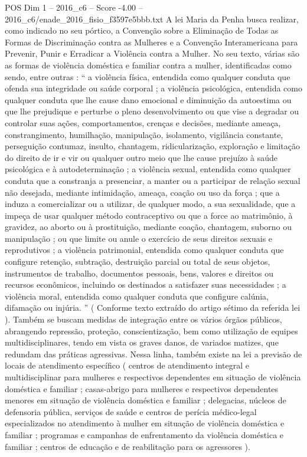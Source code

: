 \begin{textsample}{POS Dim 1 – 2016\_c6 – Score -4.00 – 2016\_c6/enade\_2016\_fisio\_f3597e5bbb.txt}
A lei Maria da Penha busca realizar, como indicado no seu pórtico, a Convenção sobre a Eliminação de Todas as Formas de Discriminação contra as Mulheres e a Convenção Interamericana para Prevenir, Punir e Erradicar a Violência contra a Mulher.
No seu texto, várias são as formas de violência doméstica e familiar contra a mulher, identificadas como sendo, entre outras : “ a violência física, entendida como qualquer conduta que ofenda sua integridade ou saúde corporal ; a violência psicológica, entendida como qualquer conduta que lhe cause dano emocional e diminuição da autoestima ou que lhe prejudique e perturbe o pleno desenvolvimento ou que vise a degradar ou controlar suas ações, comportamentos, crenças e decisões, mediante ameaça, constrangimento, humilhação, manipulação, isolamento, vigilância constante, perseguição contumaz, insulto, chantagem, ridicularização, exploração e limitação do direito de ir e vir ou qualquer outro meio que lhe cause prejuízo à saúde psicológica e à autodeterminação ; a violência sexual, entendida como qualquer conduta que a constranja a presenciar, a manter ou a participar de relação sexual não desejada, mediante intimidação, ameaça, coação ou uso da força ; que a induza a comercializar ou a utilizar, de qualquer modo, a sua sexualidade, que a impeça de usar qualquer método contraceptivo ou que a force ao matrimônio, à gravidez, ao aborto ou à prostituição, mediante coação, chantagem, suborno ou manipulação ; ou que limite ou anule o exercício de seus direitos sexuais e reprodutivos ; a violência patrimonial, entendida como qualquer conduta que configure retenção, subtração, destruição parcial ou total de seus objetos, instrumentos de trabalho, documentos pessoais, bens, valores e direitos ou recursos econômicos, incluindo os destinados a satisfazer suas necessidades ; a violência moral, entendida como qualquer conduta que configure calúnia, difamação ou injúria. ” ( Conforme texto extraído do artigo sétimo da referida lei ).
Também se buscam medidas de integração entre os vários órgãos públicos, abrangendo repressão, proteção, conscientização, bem como utilização de equipes multidisciplinares, tendo em vista os graves danos, de variados matizes, que redundam das práticas agressivas.
Nessa linha, também existe na lei a previsão de locais de atendimento específico ( centros de atendimento integral e multidisciplinar para mulheres e respectivos dependentes em situação de violência doméstica e familiar ; casas-abrigo para mulheres e respectivos dependentes menores em situação de violência doméstica e familiar ; delegacias, núcleos de defensoria pública, serviços de saúde e centros de perícia médico-legal especializados no atendimento à mulher em situação de violência doméstica e familiar ; programas e campanhas de enfrentamento da violência doméstica e familiar ; centros de educação e de reabilitação para os agressores ).

\end{textsample}
